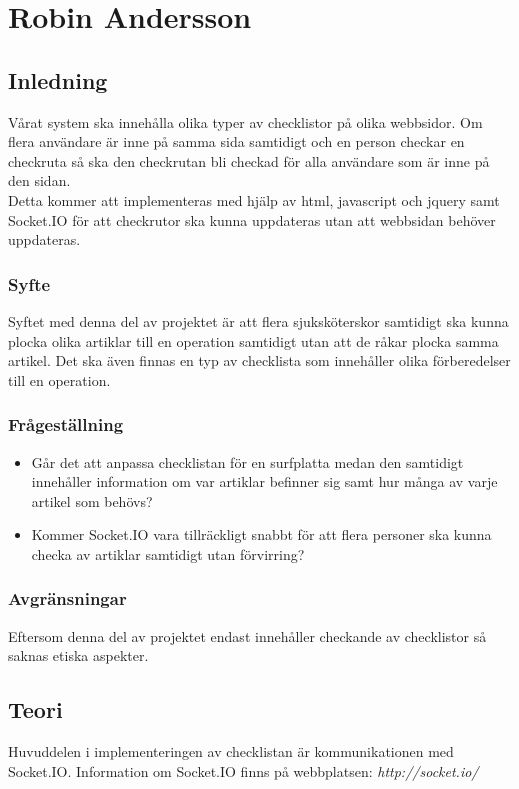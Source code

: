 \section{Robin Andersson}
\subsection{Inledning}
Vårat system ska innehålla olika typer av checklistor på olika webbsidor. Om flera användare är inne på samma sida samtidigt och en person checkar en checkruta så ska den checkrutan bli checkad för alla användare som är inne på den sidan.\\

Detta kommer att implementeras med hjälp av html, javascript och jquery samt Socket.IO för att checkrutor ska kunna uppdateras utan att webbsidan behöver uppdateras.

\subsubsection{Syfte}
Syftet med denna del av projektet är att flera sjuksköterskor samtidigt ska kunna plocka olika artiklar till en operation samtidigt utan att de råkar plocka samma artikel. Det ska även finnas en typ av checklista som innehåller olika förberedelser till en operation. 

\subsubsection{Frågeställning}
\begin{itemize}
\item Går det att anpassa checklistan för en surfplatta medan den samtidigt innehåller information om var artiklar befinner sig samt hur många av varje artikel som behövs?
\item Kommer Socket.IO vara tillräckligt snabbt för att flera personer ska kunna checka av artiklar samtidigt utan förvirring?
\end{itemize}

\subsubsection{Avgränsningar}
Eftersom denna del av projektet endast innehåller checkande av checklistor så saknas etiska aspekter.

\subsection{Teori}
Huvuddelen i implementeringen av checklistan är kommunikationen med Socket.IO. Information om Socket.IO finns på webbplatsen: \textit{http://socket.io/}
 
